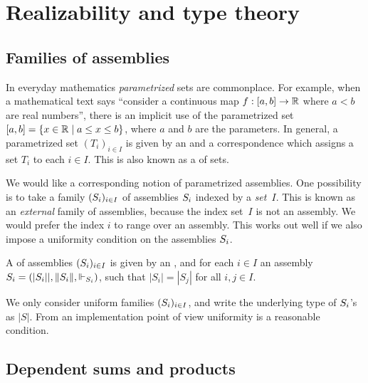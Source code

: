 \chapter{Realizability and type theory}
\label{cha:type-theory-real}

\section{Families of assemblies}
\label{sec:families-assemblies}

In everyday mathematics \emph{parametrized} sets are commonplace. For
example, when a mathematical text says ``consider a continuous map $f
: [a,b] \to \mathbb{R}$ where $a < b$ are real numbers'', there is an
implicit use of the parametrized set $[a,b] = \{x \in \mathbb{R} \mid a
  \leq x \leq b\}$, where $a$ and $b$ are the parameters. In general, a
parametrized set $(T_i)_{i \in I}$ is given by an 
and a correspondence which assigns a set $T_i$ to each $i \in I$. This
is also known as a  of sets.

We would like a corresponding notion of parametrized assemblies. One
possibility is to take a family $(S_i)_{i \in I}$ of assemblies
$S_i$ indexed by a \emph{set}~$I$. This is known as an
\emph{external} family of assemblies, because the index set~$I$ is not
an assembly. We would prefer the index $i$ to range over an assembly.
This works out well if we also impose a uniformity condition on the
assemblies $S_i$.

\begin{definition}
  A  of assemblies $(S_i)_{i \in I}$
  is given by an , and for each $i \in
  I$ an assembly $S_i = (|S_i||, \|S_i\|, {\Vdash_{S_i}})$, such that $|S_i| = |S_j|$
  for all $i, j \in I$.
\end{definition}

We only consider uniform families $(S_i)_{i \in I}$, and
write the underlying type of $S_i$'s as $|S|$. From an
implementation point of view uniformity is a reasonable condition.


\section{Dependent sums and products}
\label{sec:depend-sums-prod}


